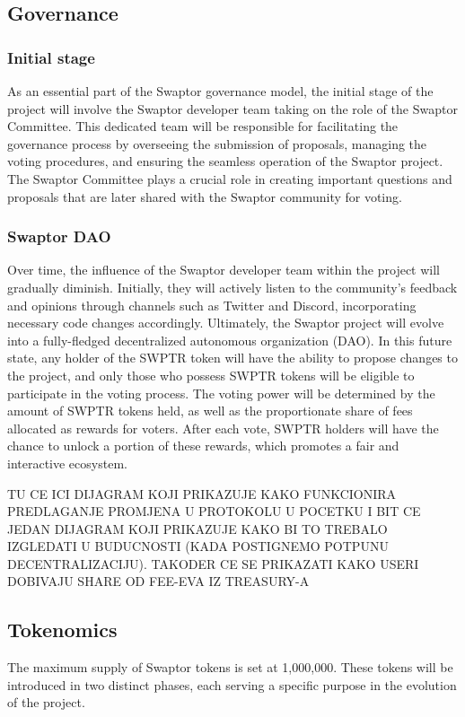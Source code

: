 \documentclass[12pt]{article}
\begin{document}
\subsection{Governance}

\subsubsection{Initial stage}
As an essential part of the Swaptor governance model, the initial stage of the project will
involve the Swaptor developer team taking on the role of the Swaptor Committee. This dedicated
team will be responsible for facilitating the governance process by overseeing the submission of proposals,
managing the voting procedures, and ensuring the seamless operation of the Swaptor project.
The Swaptor Committee plays a crucial role in creating important questions and proposals that are later shared
with the Swaptor community for voting.

\subsubsection{Swaptor DAO}
Over time, the influence of the Swaptor developer team within the project will gradually diminish.
Initially, they will actively listen to the community's feedback and opinions through channels such as Twitter and Discord,
incorporating necessary code changes accordingly. Ultimately, the Swaptor project will evolve into a fully-fledged
decentralized autonomous organization (DAO). In this future state, any holder of the SWPTR token will have the
ability to propose changes to the project, and only those who possess SWPTR tokens will be eligible to participate
in the voting process. The voting power will be determined by the amount of SWPTR tokens held, as well as the proportionate
share of fees allocated as rewards for voters. After each vote, SWPTR holders will have the chance to unlock a portion of these rewards,
which promotes a fair and interactive ecosystem.

\vspace{3cc}
TU CE ICI DIJAGRAM KOJI PRIKAZUJE KAKO FUNKCIONIRA PREDLAGANJE PROMJENA
U PROTOKOLU U POCETKU I BIT CE JEDAN DIJAGRAM KOJI PRIKAZUJE KAKO BI TO
TREBALO IZGLEDATI U BUDUCNOSTI (KADA POSTIGNEMO POTPUNU DECENTRALIZACIJU).
TAKODER CE SE PRIKAZATI KAKO USERI DOBIVAJU SHARE OD FEE-EVA IZ TREASURY-A

\newpage

\subsection{Tokenomics}
The maximum supply of Swaptor tokens is set at 1,000,000. These tokens will be introduced in two distinct phases,
each serving a specific purpose in the evolution of the project.
\end{document}
